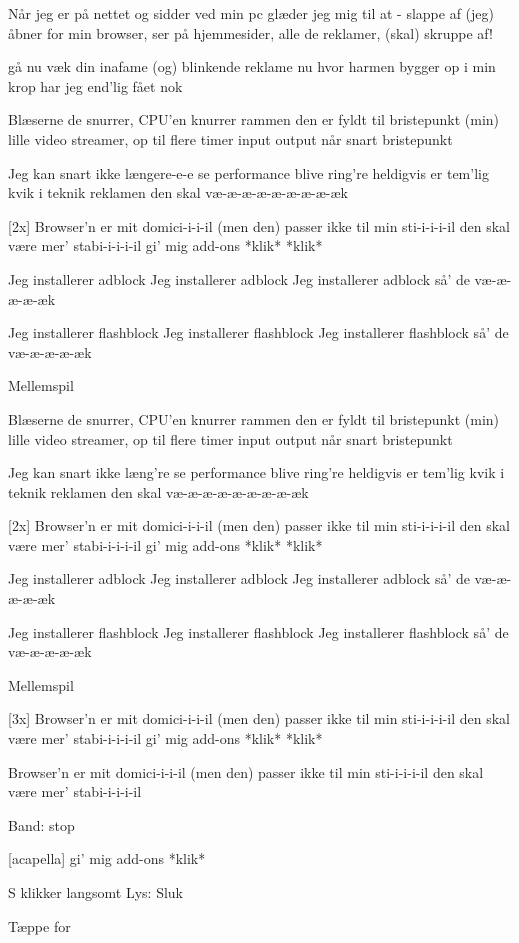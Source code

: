 \documentclass[a4paper,11pt]{article}
\begin{document}
\begin{song}

 Når jeg er på nettet og sidder ved min pc
glæder jeg mig til at - slappe af
(jeg) åbner for min browser, ser på hjemmesider,
alle de reklamer, (skal) skruppe af!

 gå nu væk din inafame
(og) blinkende reklame
nu hvor harmen bygger op i min krop
har jeg end'lig fået nok

 Blæserne de snurrer, CPU'en knurrer
rammen den er fyldt til bristepunkt
(min) lille video streamer, op til flere timer
input output når snart bristepunkt

 Jeg kan snart ikke længere-e-e
se performance blive ring're
heldigvis er tem'lig kvik i teknik
reklamen den skal væ-æ-æ-æ-æ-æ-æ-æ-æk

[2x] Browser'n er mit domici-i-i-il
(men den) passer ikke til min sti-i-i-i-il
den skal være mer' stabi-i-i-i-il
gi' mig add-ons *klik* *klik*

 Jeg installerer adblock
Jeg installerer adblock
Jeg installerer adblock
så' de væ-æ-æ-æ-æk

 Jeg installerer flashblock
Jeg installerer flashblock
Jeg installerer flashblock
så' de væ-æ-æ-æ-æk

\scene Mellemspil

 Blæserne de snurrer, CPU'en knurrer
rammen den er fyldt til bristepunkt
(min) lille video streamer, op til flere timer
input output når snart bristepunkt

 Jeg kan snart ikke læng're
se performance blive ring're
heldigvis er tem'lig kvik i teknik
reklamen den skal væ-æ-æ-æ-æ-æ-æ-æ-æk

[2x] Browser'n er mit domici-i-i-il
(men den) passer ikke til min sti-i-i-i-il
den skal være mer' stabi-i-i-i-il
gi' mig add-ons *klik* *klik*

 Jeg installerer adblock
Jeg installerer adblock
Jeg installerer adblock
så' de væ-æ-æ-æ-æk

 Jeg installerer flashblock
Jeg installerer flashblock
Jeg installerer flashblock
så' de væ-æ-æ-æ-æk

\scene Mellemspil

[3x] Browser'n er mit domici-i-i-il
(men den) passer ikke til min sti-i-i-i-il
den skal være mer' stabi-i-i-i-il
gi' mig add-ons *klik* *klik*

 Browser'n er mit domici-i-i-il
(men den) passer ikke til min sti-i-i-i-il
den skal være mer' stabi-i-i-i-il

\scene Band: stop

[acapella] gi' mig add-ons *klik*

\scene S klikker langsomt
\scene Lys: Sluk

\scene Tæppe for

\end{song}
\end{document}
